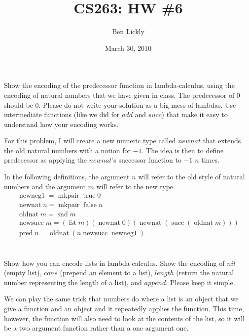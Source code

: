 \documentclass{article}
\title{CS263: HW \#6}
\author{Ben Lickly}
\date{March 30, 2010}
\newcommand{\problem}[1]
{\subsubsection*{} %
\vspace{-16pt} \section{} \vspace{-22pt} \qquad
#1%
\bigskip \bigskip
}
\begin{document}
\maketitle

\problem{Show the encoding of the predecessor function in lambda-calculus, using
the encoding of natural numbers that we have given in class. The predecessor of 0
should be 0. Please do not write your solution as a big mess of lambdas. Use
intermediate functions (like we did for $add$ and $succ$) that make it easy to
understand how your encoding works.
}

For this problem, I will create a new numeric type called $newnat$ that extends
the old natural numbers with a notion for $-1$.  The idea is then to define
predecessor as applying the $newnat$'s successor function to $-1$ $n$ times.

In the following definitions, the argument $n$ will refer to the old style of
natural numbers and the argument $m$ will refer to the new type.
\newcommand{\true}{\operatorname{true}}
\newcommand{\false}{\operatorname{false}}
\newcommand{\mkpair}{\operatorname{mkpair}}
\newcommand{\fst}{\operatorname{fst}}
\newcommand{\snd}{\operatorname{snd}}
\newcommand{\newnat}{\operatorname{newnat}}
\newcommand{\oldnat}{\operatorname{oldnat}}
\newcommand{\newnegone}{\operatorname{newneg1}}
\newcommand{\newsucc}{\operatorname{newsucc}}
\newcommand{\succe}{\operatorname{succ}}
\newcommand{\pred}{\operatorname{pred}}
\begin{align*}
\newnegone = \mkpair \true 0 \\
\newnat n = \mkpair \false n \\
\oldnat m = \snd m \\
\newsucc m = (\fst m) (\newnat 0) (\newnat (\succe (\oldnat m))) \\
\pred n = \oldnat (n \newsucc \newnegone)
\end{align*}

\problem{Show how you can encode lists in lambda-calculus. Show the encoding of
$nil$ (empty list), $cons$ (prepend an element to a list), $length$ (return the
natural number representing the length of a list), and $append$. Please keep it
simple.
}

We can play the same trick that numbers do where a list is an object that we
give a function and an object and it repeatedly applies the function. This
time, however, the function will also need to look at the contents of the list,
so it will be a two argument function rather than a one argument one.
\end{document}
